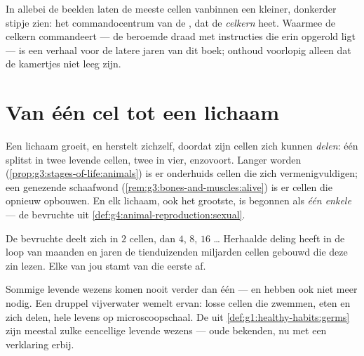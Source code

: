 \begin{remark}\label{rem:g5:first-look-at-cells:nucleus}
In allebei de beelden laten de meeste cellen vanbinnen een kleiner,
donkerder stipje zien: het commandocentrum van de , dat de
\emph{celkern} heet. Waarmee de celkern commandeert ---
de beroemde draad met instructies die erin opgerold ligt --- is een
verhaal voor de latere jaren van dit boek; onthoud voorlopig alleen dat
de kamertjes niet leeg zijn.
\end{remark}

\section{Van één cel tot een lichaam}

\begin{proposition}\label{prop:g5:first-look-at-cells:growth}
Een lichaam groeit, en herstelt zichzelf, doordat zijn cellen zich
kunnen \emph{delen}: één  splitst in twee levende cellen, twee in
vier, enzovoort. Langer worden
(\cref{prop:g3:stages-of-life:animals}) is er onderhuids cellen die zich
vermenigvuldigen; een genezende schaafwond
(\cref{rem:g3:bones-and-muscles:alive}) is er cellen die opnieuw
opbouwen. En elk lichaam, ook het grootste, is begonnen als \emph{één
enkele } --- de bevruchte  uit
\cref{def:g4:animal-reproduction:sexual}.
\end{proposition}
\admitted

\begin{example}\label{ex:g5:first-look-at-cells:one}
De bevruchte  deelt zich in $2$ cellen, dan $4$, $8$,
$16$ \dots{} Herhaalde deling heeft in de loop van maanden en jaren de
tienduizenden miljarden cellen gebouwd die deze zin lezen. Elke  van
jou stamt van die eerste af.
\end{example}

\begin{remark}\label{rem:g5:first-look-at-cells:onecelled}
Sommige levende wezens komen nooit verder dan één  --- en hebben ook
niet meer nodig. Een druppel vijverwater wemelt ervan: losse cellen die
zwemmen, eten en zich delen, hele levens op microscoopschaal. De
 uit \cref{def:g1:healthy-habits:germs} zijn meestal zulke
eencellige levende wezens --- oude bekenden, nu met een verklaring erbij.
\end{remark}

